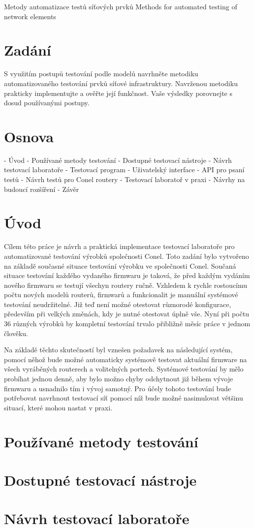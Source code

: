 \documentclass[12pt]{article}
\begin{document}
Metody automatizace testů síťových prvků
Methods for automated testing of network elements

\chapter{Zadání}

S využitím postupů testování podle modelů navrhněte metodiku automatizovaného testování prvků síťové infrastruktury. Navrženou metodiku prakticky implementujte a ověřte její funkčnost. Vaše výsledky porovnejte s dosud používanými postupy.

\chapter{Osnova}

- Úvod
- Používané metody testování
- Dostupné testovací nástroje
- Návrh testovací laboratoře
- Testovací program
- Uživatelský interface
- API pro psaní testů
- Návrh testů pro Conel routery
- Testovací laboratoř v praxi
- Návrhy na budoucí rozšíření
- Závěr

\chapter{Úvod}
Cílem této práce je návrh a praktická implementace testovací laboratoře pro automatizované testování výrobků společnosti Conel. Toto zadání bylo vytvořeno na základě současné situace testování výrobku ve společnosti Conel. Součaná situace testování každého vydaného firmwaru je taková, že před každým vydáním nového firmwaru se testují všechyn routery ručně. Vzhledem k rychle rostoucímu počtu nových modelů routerů, firmwarů a funkcionalit je manuální systémové testování neudržitelné. Již teď není možné otestovat různorodé konfigurace, především při velkých změnách, kdy je nutné otestovat úplně vše. Nyní při počtu 36 různých výrobků by kompletní testování trvalo přibližně měsíc práce v jednom člověku.

Na základě těchto skutečností byl vznešen požadavek na následující systém, pomocí něhož bude možné automaticky systémově testovat aktuální firmware na všech vyráběných routerech a volitelných portech. Systémové testování by mělo probíhat jednou denně, aby bylo možno chyby odchytnout již během vývoje firmwaru a usnadnilo tím i vývoj samotný. Pro účely tohoto testování bude potřebovat navrhnout testovací síť pomocí níž bude možné nasimulovat většinu situací, které mohou nastat v praxi. 


\chapter{Používané metody testování}
\chapter{Dostupné testovací nástroje}
\chapter{Návrh testovací laboratoře}
\end{document}
